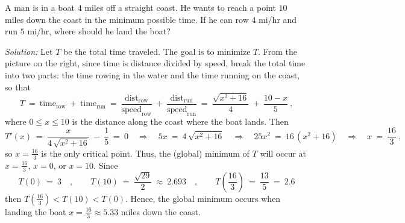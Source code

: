 \divider
\newpage
\begin{exmp}\label{exmp:minmax5}
\noindent A man is in a boat $4$ miles off a straight coast. He wants to reach a
  point $10$ miles down the coast in the minimum possible time. If he can row
  $4$ mi/hr and run $5$ mi/hr, where should he land the boat?
 \par\noindent\emph{Solution:} Let $T$ be the total time traveled. The goal is
 to minimize $T$. From the picture on the right, since time is distance divided
 by speed, break the total time into two parts: the time rowing in the water and
 the time running on the coast, so that
 \begin{displaymath}
  T ~=~ \text{time}_{\text{row}} ~+~ \text{time}_{\text{run}} ~=~
   \dfrac{\text{dist}_{\text{row}}}{\text{speed}_{\text{row}}} ~+~
   \dfrac{\text{dist}_{\text{run}}}{\text{speed}_{\text{run}}} ~=~
   \dfrac{\sqrt{x^2 + 16}}{4} ~+~ \dfrac{10-x}{5} ~,
 \end{displaymath}
 where $0 \le x \le 10$ is the distance along the coast where the boat lands.
 Then
 \begin{displaymath}
  T'(x) ~=~ \dfrac{x}{4\,\sqrt{x^2 + 16}} ~-~ \dfrac{1}{5} ~=~ 0
   \quad\Rightarrow\quad 5x ~=~ 4\,\sqrt{x^2 + 16} \quad\Rightarrow\quad
   25x^2 ~=~ 16\,(x^2 + 16) \quad\Rightarrow\quad x ~=~ \dfrac{16}{3} ~,
 \end{displaymath}
 so $x=\frac{16}{3}$ is the only critical point. Thus, the (global) minimum of
 $T$ will occur at $x=\frac{16}{3}$, $x=0$, or $x=10$. Since
\[
T(0) ~=~ 3 \quad,\qquad T(10) ~=~ \frac{\sqrt{29}}{2} ~\approx~ 2.693
\quad,\qquad T\left(\frac{16}{3}\right) ~=~ \frac{13}{5} ~=~ 2.6
\]
then $T(\frac{16}{3}) < T(10) < T(0)$. Hence, the global minimum occurs when
landing the boat $x= \frac{16}{3} \approx 5.33$ miles down the coast.\vspace{2mm}


\end{exmp}

